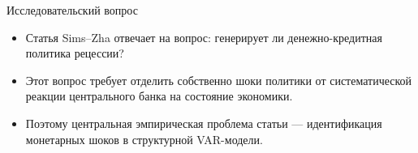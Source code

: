 \begin{frame}{Исследовательский вопрос}
\small
\begin{itemize}
\setlength\itemsep{0.45em}
\item Статья Sims--Zha отвечает на вопрос: генерирует ли денежно-кредитная политика рецессии?
\item Этот вопрос требует отделить собственно шоки политики от систематической реакции центрального банка на состояние экономики.
\item Поэтому центральная эмпирическая проблема статьи — идентификация монетарных шоков в структурной VAR-модели.
\end{itemize}
\end{frame}
